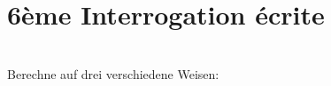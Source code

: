 


\pagestyle{empty}
\section*{6ème Interrogation écrite}

\\
Berechne auf drei verschiedene Weisen:\\
[Contenu fractions...]
